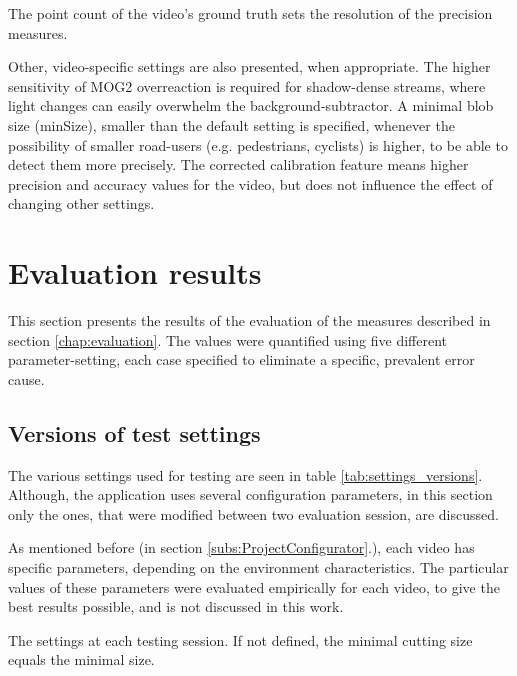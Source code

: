 The point count of the video's ground truth sets the resolution of the precision measures.

Other, video-specific settings are also presented, when appropriate.
The higher sensitivity of MOG2 overreaction is required for shadow-dense streams, where light changes can easily overwhelm the background-subtractor.
A minimal blob size (minSize), smaller than the default setting is specified, whenever the possibility of smaller road-users (e.g. pedestrians, cyclists) is higher, to be able to detect them more precisely.
The corrected calibration feature means higher precision and accuracy values for the video, but does not influence the effect of changing other settings. 
\FloatBarrier

\section{Evaluation results}
This section presents the results of the evaluation of the measures described in section \ref{chap:evaluation}.
The values were quantified using five different parameter-setting, each case specified to eliminate a specific, prevalent error cause.

\subsection{Versions of test settings}
The various settings used for testing are seen in table \ref{tab:settings_versions}.
Although, the application uses several configuration parameters, in this section only the ones, that were modified between two evaluation session, are discussed.

As mentioned before (in section \ref{subs:ProjectConfigurator}.), each video has specific parameters, depending on the environment characteristics.
The particular values of these parameters were evaluated empirically for each video, to give the best results possible, and is not discussed in this work.

\begin{table}[!h]
	\begin{adjustbox}{center}
	\end{adjustbox}
	\caption{The settings at each testing session. If not defined, the minimal cutting size equals the minimal size.}
	\label{tab:settings_versions}
\end{table}

